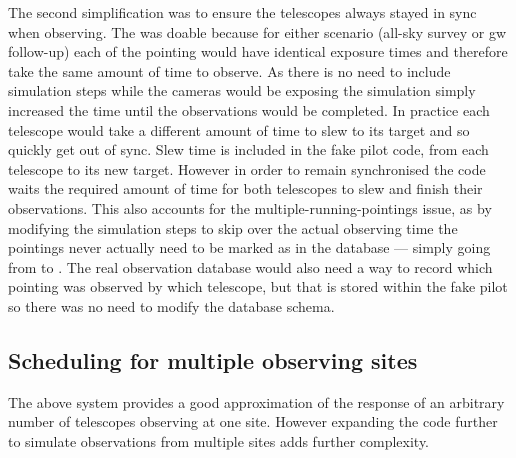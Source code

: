 \begin{colsection}
\begin{colsection}
The second simplification was to ensure the telescopes always stayed in sync when observing. The was doable because for either scenario (all-sky survey or \gls{gw} follow-up) each of the pointing would have identical exposure times and therefore take the same amount of time to observe. As there is no need to include simulation steps while the cameras would be exposing the simulation simply increased the time until the observations would be completed. In practice each telescope would take a different amount of time to slew to its target and so quickly get out of sync. Slew time is included in the fake pilot code, from each telescope to its new target. However in order to remain synchronised the code waits the required amount of time for both telescopes to slew and finish their observations. This also accounts for the multiple-running-pointings issue, as by modifying the simulation steps to skip over the actual observing time the pointings never actually need to be marked as  in the database --- simply going from  to . The real observation database would also need a way to record which pointing was observed by which telescope, but that is stored within the fake pilot so there was no need to modify the database schema.

\end{colsection}


\subsection{Scheduling for multiple observing sites}
\label{sec:multi_site_scheduling}
\begin{colsection}

The above system provides a good approximation of the response of an arbitrary number of telescopes observing at one site. However expanding the code further to simulate observations from multiple sites adds further complexity.


\end{colsection}
\end{colsection}
